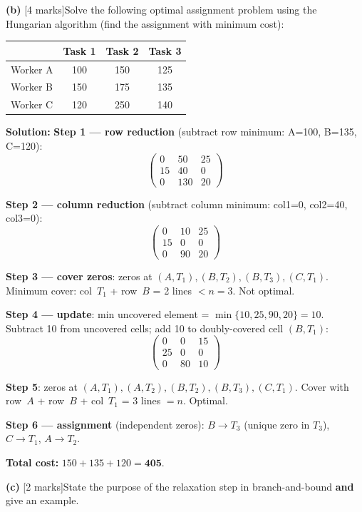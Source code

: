 \documentclass[10pt,a4paper]{article}
\newcommand{\Sol}{\par\vspace{4pt}\noindent\textbf{Solution:}\enspace}
\begin{document}
\vspace{4pt}
\noindent\textbf{(b)} [4 marks]\quad Solve the following optimal assignment
problem using the Hungarian algorithm (find the assignment with minimum cost):

\begin{center}
\begin{tabular}{lccc}
\toprule
 & Task 1 & Task 2 & Task 3 \\
\midrule
Worker A & 100 & 150 & 125 \\
Worker B & 150 & 175 & 135 \\
Worker C & 120 & 250 & 140 \\
\bottomrule
\end{tabular}
\end{center}

\Sol
\textbf{Step 1 --- row reduction} (subtract row minimum: A=100, B=135, C=120):
\[
  \begin{pmatrix}0&50&25\\15&40&0\\0&130&20\end{pmatrix}
\]

\textbf{Step 2 --- column reduction} (subtract column minimum: col1=0, col2=40, col3=0):
\[
  \begin{pmatrix}0&10&25\\15&0&0\\0&90&20\end{pmatrix}
\]

\textbf{Step 3 --- cover zeros}: zeros at $(A,T_1),(B,T_2),(B,T_3),(C,T_1)$.
Minimum cover: col~$T_1$ + row~$B$ = 2 lines $< n=3$. Not optimal.

\textbf{Step 4 --- update}: min uncovered element =
$\min\{10,25,90,20\}=10$. Subtract 10 from uncovered cells; add 10 to
doubly-covered cell $(B,T_1)$:
\[
  \begin{pmatrix}0&0&15\\25&0&0\\0&80&10\end{pmatrix}
\]

\textbf{Step 5}: zeros at $(A,T_1),(A,T_2),(B,T_2),(B,T_3),(C,T_1)$.
Cover with row~$A$ + row~$B$ + col~$T_1$ = 3 lines $= n$. Optimal.

\textbf{Step 6 --- assignment} (independent zeros):
$B\!\to\! T_3$\; (unique zero in $T_3$),\; $C\!\to\! T_1$,\; $A\!\to\! T_2$.

\textbf{Total cost:} $150 + 135 + 120 = \mathbf{405}$.

\vspace{4pt}
\noindent\textbf{(c)} [2 marks]\quad State the purpose of the relaxation step
in branch-and-bound \textbf{and} give an example.
\end{document}
